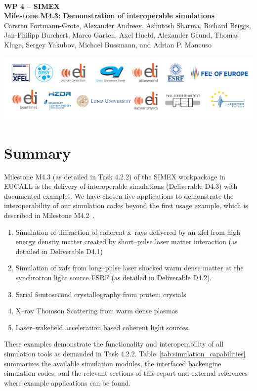 \documentclass[12pt]{scrartcl}
\begin{document}
\makeatletter
\begin{titlepage}
\thispagestyle{scrheadings}
\begin{center}
  $~$\\
  \vspace{2cm}
  \Huge{\textbf{WP 4 -- SIMEX\\[1cm]
    Milestone M4.3: Demonstration of interoperable simulations%
  }}\\
  \vspace{2cm}
  \large{Carsten Fortmann-Grote, Alexander Andreev, Ashutosh Sharma, Richard
    Briggs, Jan-Philipp Burchert, Marco Garten, Axel Huebl, Alexander Grund,
  Thomas Kluge, Sergey Yakubov, Michael Bussmann, and Adrian P. Mancuso}
  \vspace{1cm}
  \date{\today}
\end{center}
\vfill%
\includegraphics[width=\textwidth]{figures/PartnerLogos_2017}
\end{titlepage}
\makeatother
%
\tableofcontents
%
\newpage
%
\section{Summary}\label{sec:summary}
Milestone M4.3 (as detailed in Task 4.2.2) of the SIMEX
workpackage in EUCALL is the delivery of interoperable simulations
(Deliverable D4.3) with documented examples. We have chosen five
applications to demonstrate the interoperability of our simulation codes beyond
the first usage example, which is described in Milestone
M4.2~\cite{EUCALL_SIMEX_M4.2}.
%
\begin{enumerate}
  \item Simulation of diffraction of coherent x--rays delivered by an
    \gls{xfel}
    from high energy density matter created by short--pulse
    laser matter interaction (as detailed in Deliverable D4.1)
  \item Simulation of \gls{xafs} from long--pulse laser
    shocked warm dense matter at the synchrotron light source ESRF (as detailed
    in Deliverable D4.2).
  \item Serial femtosecond crystallography from protein crystals
  \item X--ray Thomson Scattering from warm dense plasmas
  \item Laser--wakefield acceleration based coherent light sources
\end{enumerate}
%
These examples demonstrate the functionality and interoperability of all
simulation tools as demanded in Task 4.2.2.
Table~\ref{tab:simulation_capabilities} summarizes the available simulation
modules, the interfaced backengine simulation codes, and the relevant sections
of this report and external references where example applications can be found.
\end{document}
